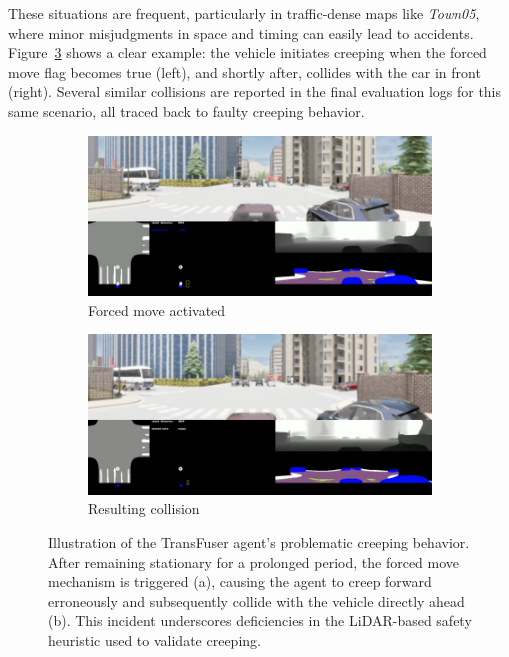 These situations are frequent, particularly in traffic-dense maps like \textit{Town05}, where minor misjudgments in space and timing can easily lead to accidents. Figure~\ref{fig:tf_forced_collision} shows a clear example: the vehicle initiates creeping when the forced move flag becomes true (left), and shortly after, collides with the car in front (right). Several similar collisions are reported in the final evaluation logs for this same scenario, all traced back to faulty creeping behavior.

\begin{figure}[htbp]
    \centering
    \begin{subfigure}[b]{0.45\textwidth}
        \centering
        \includegraphics[width=\columnwidth]{images/RS23_official_forced.png}
        \caption{Forced move activated}
        \label{fig:tf_forced_collision_a}
    \end{subfigure}
    \hfill
    \begin{subfigure}[b]{0.45\textwidth}
        \centering
        \includegraphics[width=\columnwidth]{images/RS23_official_collisionforced.png}
        \caption{Resulting collision}
        \label{fig:tf_forced_collision_b}
    \end{subfigure}
    \caption{Illustration of the TransFuser agent's problematic creeping behavior. After remaining stationary for a prolonged period, the forced move mechanism is triggered (a), causing the agent to creep forward erroneously and subsequently collide with the vehicle directly ahead (b). This incident underscores deficiencies in the LiDAR-based safety heuristic used to validate creeping.}
\label{fig:tf_forced_collision}
\end{figure}

